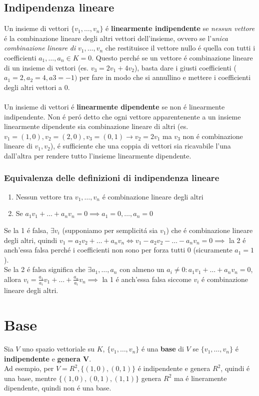 \documentclass{article}
\begin{document}
\subsection{Indipendenza lineare}
Un insieme di vettori $\{v_1, \dots, v_n\}$ é \textbf{linearmente indipendente} se \textit{nessun vettore} é la combinazione lineare degli altri vettori dell'insieme, ovvero se l'\textit{unica combinazione lineare di} $v_1, \dots, v_n$ che restituisce il vettore nullo é quella con tutti i coefficienti $a_1, \dots, a_n \in K = 0$. Questo perché se un vettore é combinazione lineare di un insieme di vettori (es. $v_3 = 2v_1 + 4v_2$), basta dare i giusti coefficienti ($a_1=2, a_2=4, a3=-1)$ per fare in modo che si annullino e mettere i coefficienti degli altri vettori a 0.\\\\
Un insieme di vettori é \textbf{linearmente dipendente} se non é linearmente indipendente. Non é peró detto che ogni vettore apparentenente a un insieme linearmente dipendente sia combinazione lineare di altri (es. $v_1 = (1,0), v_2 = (2,0), v_3 = (0,1) \rightarrow v_2=2v_1$ ma $v_3$ non é combinazione lineare di $v_1, v_2$), é sufficiente che una coppia di vettori sia ricavabile l'una dall'altra per rendere tutto l'insieme linearmente dipendente.

\subsubsection{Equivalenza delle definizioni di indipendenza lineare}
\begin{enumerate}
	\item Nessun vettore tra $v_1, \dots, v_n$ é combinazione lineare degli altri
	\item Se $a_1v_1 + \dots + a_nv_n = 0 \implies a_1=0, \dots,a_n=0$
\end{enumerate}
Se la 1 é falsa, $\exists v_i$ (supponiamo per semplicitá sia $v_1$) che é combinazione lineare degli altri, quindi $v_1 = a_2v_2 + \dots + a_nv_n \iff v_1 - a_2v_2 - \dots - a_nv_n = 0 \implies$ la 2 é anch'essa falsa perché i coefficienti non sono per forza tutti 0 (sicuramente $a_1=1$).\\
Se la 2 é falsa significa che $\exists a_1, \dots, a_n$ con almeno un $a_i \ne 0 : a_1v_1 + \dots + a_nv_n = 0$, allora $\displaystyle v_i = \frac{a_1}{a_i}v_1 + \dots + \frac{a_n}{a_i}v_n \implies$ la 1 é anch'essa falsa siccome $v_i$ é combinazione lineare degli altri.

\section{Base}
Sia $V$ uno spazio vettoriale su $K$, $\{v_1, \dots, v_n\}$ é una \textbf{base} di $V$ se $\{v_1, \dots, v_n\}$ é \textbf{indipendente} e \textbf{genera V}.\\
Ad esempio, per $V=R^2, \{(1,0),(0,1)\}$ é indipendente e genera $R^2$, quindi é una base, mentre $\{(1,0), (0,1), (1,1)\}$ genera $R^2$ ma é lineramente dipendente, quindi non é una base.
\end{document}
